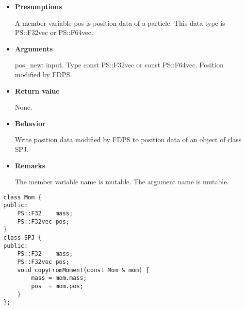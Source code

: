 \begin{itemize}

\item {\bf Presumptions}
  
  A member variable pos is position data of a particle. This data type
  is PS::F32vec or PS::F64vec.

\item {\bf Arguments}

  pos\_new: input. Type const PS::F32vec or const PS::F64vec. Position
  modified by FDPS.

\item {\bf Return value}

  None.
  
\item {\bf Behavior}

  Write position data modified by FDPS to position data of an object
  of class SPJ.

\item {\bf Remarks}

  The member variable name is mutable. The argument name is mutable.

\end{itemize}


\begin{screen}
\begin{verbatim}
class Mom {
public:
    PS::F32    mass;
    PS::F32vec pos;
}
class SPJ {
public:
    PS::F32    mass;
    PS::F32vec pos;
    void copyFromMoment(const Mom & mom) {
        mass = mom.mass;
        pos  = mom.pos;
    }
};
\end{verbatim}
\end{screen}

